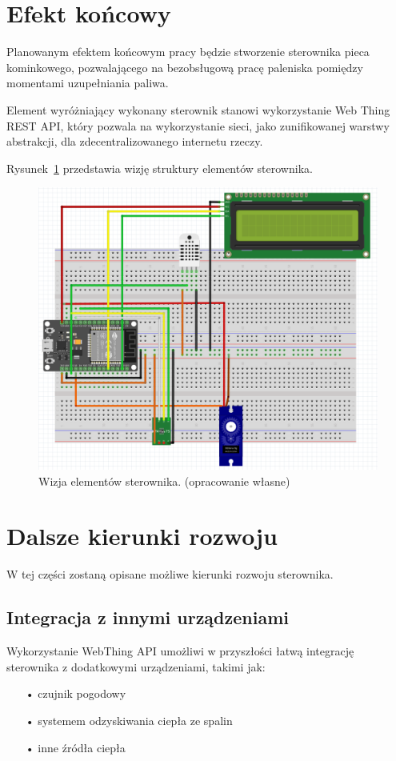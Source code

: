 \documentclass[11pt]{report}
\begin{document}
 \section{Efekt końcowy}
 Planowanym efektem końcowym pracy będzie stworzenie sterownika pieca kominkowego, pozwalającego na bezobsługową pracę paleniska pomiędzy momentami uzupełniania paliwa.

 Element wyróżniający wykonany sterownik stanowi wykorzystanie Web Thing REST API, który pozwala na wykorzystanie sieci, jako zunifikowanej warstwy abstrakcji, dla zdecentralizowanego internetu rzeczy.
 
 Rysunek~\ref{fig:wizja} przedstawia wizję struktury elementów sterownika.
 \begin{figure}[ht]
\centering
\includegraphics[width=0.8 \textwidth]{fig/fritzing_bredboard_v1.png}
\caption{Wizja elementów sterownika. (opracowanie własne)}
\label{fig:wizja}
\end{figure}
 
 \section{Dalsze kierunki rozwoju}
 W tej części zostaną opisane możliwe kierunki rozwoju sterownika.
 \subsection{Integracja z innymi urządzeniami}
 Wykorzystanie WebThing API umożliwi w przyszłości łatwą integrację sterownika z dodatkowymi urządzeniami, takimi jak:
 \begin{enumerate}
 \item[•] czujnik pogodowy
 \item[•] systemem odzyskiwania ciepła ze spalin
 \item[•] inne źródła ciepła
 \end{enumerate}
\end{document}
